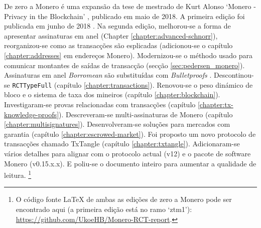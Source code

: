 De zero a Monero é uma expansão da tese de mestrado de Kurt Alonso `Monero - Privacy in the Blockchain' \cite{kurt-original}, publicado em maio de 2018. A primeira edição foi publicada em junho de 2018 \cite{ztm-1}.
Na segunda edição, melhorou-se a forma de apresentar assinaturas em anel (Chapter \ref{chapter:advanced-schnorr}), reorganizou-se como as transacções são esplicadas
(adicionou-se o capítulo \ref{chapter:addresses} em endereços Monero). Modernizou-se o méthodo usado para comunicar montantes de saídas de transacção (secção  \ref{sec:pedersen_monero}). Assinaturas em anel {\em Borromean} são substituídas com {\em Bulletproofs} . Descontinou-se {\tt RCTTypeFull} (capítulo \ref{chapter:transactions}). Renovou-se o peso dinámico de bloco e o sistema de taxa dos mineiros (capítulo \ref{chapter:blockchain}).
Investigaram-se provas relacionadas com transacções (capítulo \ref{chapter:tx-knowledge-proofs}). Descreveram-se multi-assinaturas de Monero (capítulo \ref{chapter:multisignatures}). Desenvolveram-se soluções para mercados com garantia (capítulo \ref{chapter:escrowed-market}). Foi proposto um novo protocolo de transacções chamado TxTangle (capítulo \ref{chapter:txtangle}). Adicionaram-se vários detalhes para alignar com o protocolo actual (v12) e o pacote de software Monero (v0.15.x.x). E poliu-se o documento inteiro para aumentar a qualidade de leitura.  
\footnote{O código fonte \LaTeX{} de ambas as edições de zero a Monero pode ser encontrado aqui (a primeira edição está no ramo `ztm1'):
\url{https://github.com/UkoeHB/Monero-RCT-report}.}



